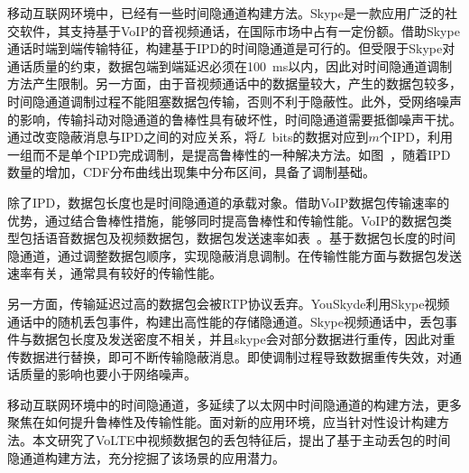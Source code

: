 移动互联网环境中，已经有一些时间隐通道构建方法。Skype是一款应用广泛的社交软件，其支持基于VoIP的音视频通话，在国际市场中占有一定份额。借助Skype通话时端到端传输特征，构建基于IPD的时间隐通道是可行的。但受限于Skype对通话质量的约束，数据包端到端延迟必须在{100\ ms}以内，因此对时间隐通道调制方法产生限制。另一方面，由于音视频通话中的数据量较大，产生的数据包较多，时间隐通道调制过程不能阻塞数据包传输，否则不利于隐蔽性。此外，受网络噪声的影响，传输抖动对隐通道的鲁棒性具有破坏性，时间隐通道需要抵御噪声干扰。通过改变隐蔽消息与IPD之间的对应关系，将{$L$\ bits}的数据对应到$m$个IPD，利用一组而不是单个IPD完成调制，是提高鲁棒性的一种解决方法。如图\ ，随着IPD数量的增加，CDF分布曲线出现集中分布区间，具备了调制基础。


除了IPD，数据包长度也是时间隐通道的承载对象。借助VoIP数据包传输速率的优势，通过结合鲁棒性措施，能够同时提高鲁棒性和传输性能。VoIP的数据包类型包括语音数据包及视频数据包，数据包发送速率如表\ 。基于数据包长度的时间隐通道，通过调整数据包顺序，实现隐蔽消息调制。在传输性能方面与数据包发送速率有关，通常具有较好的传输性能。

另一方面，传输延迟过高的数据包会被RTP协议丢弃。YouSkyde利用Skype视频通话中的随机丢包事件，构建出高性能的存储隐通道。Skype视频通话中，丢包事件与数据包长度及发送密度不相关，并且skype会对部分数据进行重传，因此对重传数据进行替换，即可不断传输隐蔽消息。即使调制过程导致数据重传失效，对通话质量的影响也要小于网络噪声。

移动互联网环境中的时间隐通道，多延续了以太网中时间隐通道的构建方法，更多聚焦在如何提升鲁棒性及传输性能。面对新的应用环境，应当针对性设计构建方法。本文研究了VoLTE中视频数据包的丢包特征后，提出了基于主动丢包的时间隐通道构建方法，充分挖掘了该场景的应用潜力。

